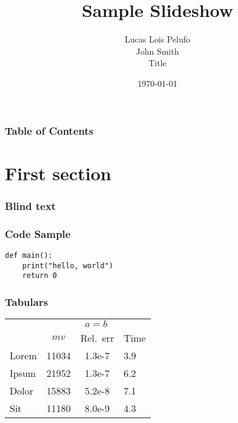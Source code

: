 \documentclass[slides,dark]{baseline}
\title[SLIDES]{Sample Slideshow}
\author[Lois]{
  Lucas Lois Pelufo \\[12pt]
  John Smith \\[-10pt]
  {\tiny Title}
}
\institute[CMP]{Long Form Company Name}
\date{\today}
\begin{document}
\frame[plain]{\titlepage}

\begin{frame}
\frametitle{Table of Contents}
\tableofcontents
\end{frame}

\section{First section}

\begin{frame}
  \frametitle{Blind text}
  \blindtext
\end{frame}

\begin{frame}[fragile]
\frametitle{Code Sample}

\begin{verbatim}
def main():
    print("hello, world")
    return 0
\end{verbatim}
\end{frame}

\begin{frame}
\frametitle{Tabulars}
\centering

\begin{tabular}{lccl}\toprule
      & \multicolumn{3}{c}{\(a = b\)} \\
      \cmidrule(lr){2-4}
      & \(mv\)  & Rel.~err & Time \\\midrule
Lorem & 11034   & 1.3e-7   & 3.9  \\
Ipsum & 21952   & 1.3e-7   & 6.2  \\
Dolor & 15883   & 5.2e-8   & 7.1  \\
Sit   & 11180   & 8.0e-9   & 4.3  \\\bottomrule
\end{tabular}
\end{frame}
\end{document}
